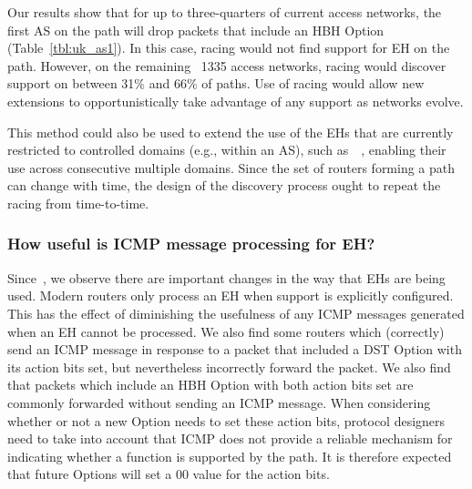 \documentclass[conference]{IEEEtran}
\begin{document}
Our results show that for up to three-quarters of current access networks, the first AS on the path will drop packets that include an HBH Option (Table~\ref{tbl:uk_as1}). In this case, racing would  not find support for EH on the path. However, on the remaining ~1335 access networks, racing would discover support on between 31\% and 66\% of paths. Use of racing would allow new extensions to opportunistically take advantage of any support as networks evolve.

This method could also be used to extend the use of the EHs that are currently restricted to controlled domains (e.g., within an AS), such as~\cite{rfc8250}~\cite{ietf-ippm-ioam-ipv6-options-12}, enabling their use across consecutive multiple domains.
Since the set of routers forming a path can change with time, the design of the discovery process ought to repeat the racing from time-to-time. 

\subsubsection{ How useful is ICMP message processing for EH?}

Since~\cite{rfc2460}, we observe there are important changes in the way that EHs are being  used. Modern routers only process an EH when support is explicitly configured. This has the effect of diminishing the usefulness of any ICMP messages generated when an EH cannot be processed. 
We also find some routers which (correctly) send an ICMP message in response to a packet that included a DST Option with its action bits set, but nevertheless incorrectly forward the packet. We also find that packets which include an HBH Option with both action bits set are commonly forwarded without sending an ICMP message. When considering whether or not a new Option needs to set these action bits, protocol designers need to take into account that ICMP does not provide a reliable mechanism for indicating whether a function is supported by the path.
It is therefore expected that future Options will set a 00 value for the action bits.

\end{document}
